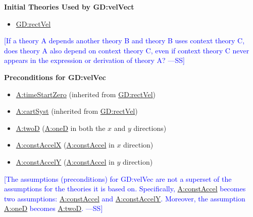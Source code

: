 \documentclass[12pt]{article}
\newcommand{\authornote}[3]{\textcolor{#1}{[#3 ---#2]}}
\newcommand{\authornote}[3]{}
\newcommand{\wss}[1]{\authornote{blue}{SS}{#1}}
\begin{document}
\noindent \textbf{Initial Theories Used by GD:velVect}

\begin{itemize}
\item \hyperref[GD:rectVel]{GD:rectVel}
\end{itemize}

\wss{If a theory A depends another theory B and theory B uses context theory C,
does theory A also depend on context theory C, even if context theory C never
appears in the expression or derivation of theory A?}

\noindent \textbf{Preconditions for GD:velVec}
\begin{itemize}
\item \hyperref[timeStartZero]{A:timeStartZero} (inherited from \hyperref[GD:rectVel]{GD:rectVel})
\item \hyperref[cartSyst]{A:cartSyst} (inherited from
\hyperref[GD:rectVel]{GD:rectVel})
\item \hyperref[twoD]{A:twoD} (\hyperref[oneD]{A:oneD} in both the $x$ and $y$ directions)
\item \hyperref[constAccelX]{A:constAccelX} (\hyperref[constAccel]{A:constAccel}
in $x$ direction)
\item \hyperref[constAccelY]{A:constAccelY} (\hyperref[constAccel]{A:constAccel}
in $y$ direction)
\end{itemize}

\wss{The assumptions (preconditions) for GD:velVec are not a superset of the assumptions for the theories it is based on.  Specifically, \hyperref[constAccel]{A:constAccel} becomes two assumptions: \hyperref[constAccel]{A:constAccel} and \hyperref[constAccelY]{A:constAccelY}.  Moreover, the assumption \hyperref[oneD]{A:oneD} becomes \hyperref[twoD]{A:twoD}.}
\end{document}
